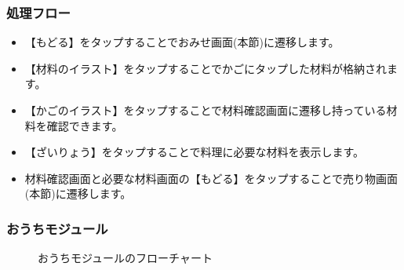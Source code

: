 \documentclass[a4j]{jarticle}
\begin{document}
\subsubsection*{処理フロー}
\begin{itemize}
\item【もどる】をタップすることでおみせ画面(本節)に遷移します。
\item【材料のイラスト】をタップすることでかごにタップした材料が格納されます。
\item【かごのイラスト】をタップすることで材料確認画面に遷移し持っている材料を確認できます。
\item【ざいりょう】をタップすることで料理に必要な材料を表示します。
\item 材料確認画面と必要な材料画面の【もどる】をタップすることで売り物画面(本節)に遷移します。
\end{itemize}

\newpage
\subsubsection{おうちモジュール\label{おうち}}
\begin{figure}[H]
    \begin{center}
    \caption {おうちモジュールのフローチャート}
    \label{outi}
    \end{center}
\end{figure}
\end{document}
